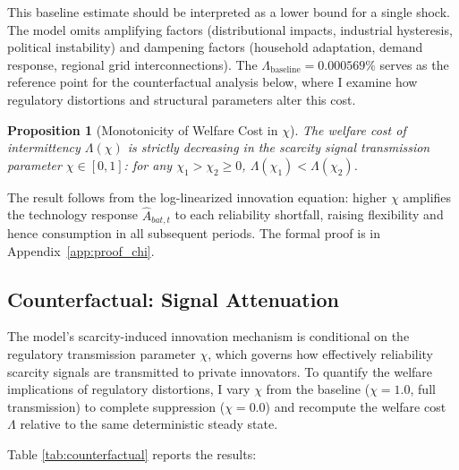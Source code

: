 \documentclass[12pt, a4paper]{article}
\newtheorem{proposition}{Proposition}
\begin{document}
	This baseline estimate should be interpreted as a lower bound for a single shock. The model omits amplifying factors (distributional impacts, industrial hysteresis, political instability) and dampening factors (household adaptation, demand response, regional grid interconnections). The $\Lambda_{\text{baseline}} = 0.000569\%$ serves as the reference point for the counterfactual analysis below, where I examine how regulatory distortions and structural parameters alter this cost.

	\begin{proposition}[Monotonicity of Welfare Cost in $\chi$] \label{prop:chi_monotonicity}
		The welfare cost of intermittency $\Lambda(\chi)$ is strictly decreasing in the scarcity signal transmission parameter $\chi \in [0,1]$: for any $\chi_1 > \chi_2 \geq 0$, $\Lambda(\chi_1) < \Lambda(\chi_2)$.
	\end{proposition}

	
	\noindent The result follows from the log-linearized innovation equation: higher $\chi$ amplifies the technology response $\hat{A}_{bat,t}$ to each reliability shortfall, raising flexibility and hence consumption in all subsequent periods. The formal proof is in Appendix~\ref{app:proof_chi}.

	\subsection{Counterfactual: Signal Attenuation}

	The model's scarcity-induced innovation mechanism is conditional on the regulatory transmission parameter $\chi$, which governs how effectively reliability scarcity signals are transmitted to private innovators. To quantify the welfare implications of regulatory distortions, I vary $\chi$ from the baseline ($\chi = 1.0$, full transmission) to complete suppression ($\chi = 0.0$) and recompute the welfare cost $\Lambda$ relative to the same deterministic steady state.

	Table \ref{tab:counterfactual} reports the results:
\end{document}
